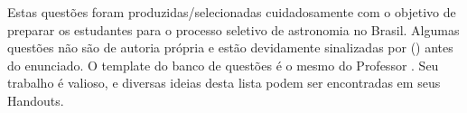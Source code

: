 \documentclass[11pt]{article}
\begin{document}

Estas questões foram produzidas/selecionadas cuidadosamente com o objetivo de preparar os estudantes para o processo seletivo de astronomia no Brasil. Algumas questões não são de autoria própria e estão devidamente sinalizadas por () antes do enunciado. O template do banco de questões é o mesmo do Professor . Seu trabalho é valioso, e diversas ideias desta lista podem ser encontradas em seus Handouts.




\end{document}
